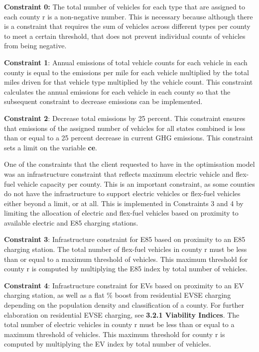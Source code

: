 \documentclass[answers]{exam}
\begin{document}
\begin{outline}
\1 \textbf{Constraint 0:} The total number of vehicles for each type that are assigned to each county r is a non-negative number. This is necessary because although there is a constraint that requires the sum of vehicles across different types per county to meet a certain threshold, that does not prevent individual counts of vehicles from being negative. 

\1 \textbf{Constraint 1}: Annual emissions of total vehicle counts for each vehicle in each county is equal to the emissions per mile for each vehicle multiplied by the total miles driven for that vehicle type multiplied by the vehicle count. This constraint calculates the annual emissions for each vehicle in each county so that the subsequent constraint to decrease emissions can be implemented. 

\1 \textbf{Constraint 2}: Decrease total emissions by 25 percent. This constraint ensures that emissions of the assigned number of vehicles for all states combined is less than or equal to a 25 percent decrease in current GHG emissions. This constraint sets a limit on the variable \textbf{ce}. 

\0 One of the constraints that the client requested to have in the optimisation model was an infrastructure constraint that reflects maximum electric vehicle and flex-fuel vehicle capacity per county. This is an important constraint, as some counties do not have the infrastructure to support electric vehicles or flex-fuel vehicles either beyond a limit, or at all. This is implemented in Constraints 3 and 4 by limiting the allocation of electric and flex-fuel vehicles based on proximity to available electric and E85 charging stations.

\1 \textbf{Constraint 3}: Infrastructure constraint for E85 based on proximity to an E85 charging station. The total number of flex-fuel vehicles in county r must be less than or equal to a maximum threshold of vehicles. This maximum threshold for county r is computed by multiplying the E85 index by total number of vehicles.

\1 \textbf{Constraint 4}: Infrastructure constraint for EVs based on proximity to an EV charging station, as well as a flat \% boost from residential EVSE charging depending on the population density and classification of a county. For further elaboration on residential EVSE charging, see \textbf{3.2.1 Viability Indices}. The total number of electric vehicles in county r must be less than or equal to a maximum threshold of vehicles. This maximum threshold for county r is computed by multiplying the EV index by total number of vehicles.


\end{outline}
\end{document}
